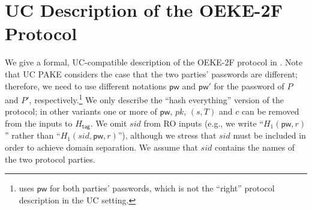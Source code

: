 \documentclass{article}
\theoremstyle{plain}
\theoremstyle{definition}
\theoremstyle{remark}
\newcommand{\Htag}{H_\mathsf{tag}}
\newcommand{\pw}{\mathsf{pw}}
\begin{document}
\section{UC Description of the OEKE-2F Protocol}
\label{sec:protocol-uc}
We give a formal, UC-compatible description of the OEKE-2F protocol in . Note that UC PAKE considers the case that the two parties' passwords are different; therefore, we need to use different notations $\pw$ and $\pw'$ for the password of $P$ and $P'$, respectively.\footnote{\cite[Fig.4]{EPRINT:ArrBarJar25} uses $\pw$ for both parties' passwords, which is not the ``right'' protocol description in the UC setting.} We only describe the ``hash everything'' version of the protocol; in other variants one or more of $\pw$, $pk$, $(s,T)$ and $c$ can be removed from the inputs to $\Htag$. We omit $sid$ from RO inputs (e.g., we write ``$H_1(\pw,r)$'' rather than ``$H_1(sid,\pw,r)$''), although we stress that $sid$ must be included in order to achieve domain separation. We assume that $sid$ contains the names of the two protocol parties.
\end{document}
